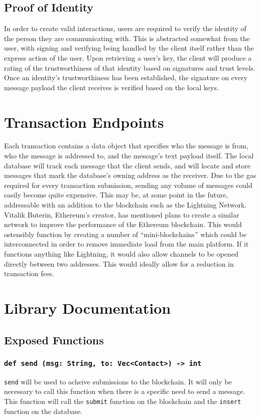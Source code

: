 \documentclass[]{article}
\begin{document}
\subsection{Proof of Identity}
In order to create valid interactions, users are required to verify the identity of the person they are communicating with. This is abstracted somewhat from the user, with signing and verifying being handled by the client itself rather than the express action of the user. Upon retrieving a user's key, the client will produce a rating of the trustworthiness of that identity based on signatures and trust levels. Once an identity's trustworthiness has been established, the signature on every message payload the client receives is verified based on the local keys.

\section{Transaction Endpoints}
Each transaction contains a data object that specifies who the message is from, who the message is addressed to, and the message's text payload itself. The local database will track each message that the client sends, and will locate and store messages that mark the database's owning address as the receiver. Due to the gas required for every transaction submission, sending any volume of messages could easily become quite expensive. This may be, at some point in the future, addressable with an addition to the blockchain such as the Lightning Network. Vitalik Buterin, Ethereum's creator, has mentioned plans to create a similar network to improve the performance of the Ethereum blockchain. This would ostensibly function by creating a number of ``mini-blockchains'' which could be interconnected in order to remove immediate load from the main platform. If it functions anything like Lightning, it would also allow channels to be opened directly between two addresses. This would ideally allow for a reduction in transaction fees.

\section{Library Documentation}

\subsection{Exposed Functions}
\subsubsection{\texttt{def send (msg: String, to: Vec<Contact>) -> int}}
\texttt{send} will be used to acheive submissions to the blockchain. It will only be necessary to call this function when there is a specific need to send a message. This function will call the \texttt{submit} function on the blockchain and the \texttt{insert} function on the database.
\end{document}

